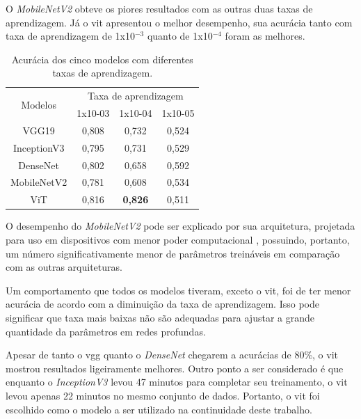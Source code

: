 O \textit{MobileNetV2} obteve os piores resultados com as outras duas taxas de aprendizagem.
Já o \acrshort{vit} apresentou o melhor desempenho, sua acurácia tanto com taxa de aprendizagem de 1x10$^{-3}$ quanto de 1x10$^{-4}$ foram as melhores.

\begin{table}[tb]
\caption{\label{tab:metrics} Acurácia dos cinco modelos com diferentes taxas de aprendizagem.}
\begin{center}
\begin{tabular}{c|ccc}
\toprule
\multirow{2}{*}{Modelos} & \multicolumn{3}{c}{Taxa de aprendizagem}   \\
                         & 1x10-03     & 1x10-04     & 1x10-05     \\
\midrule
VGG19                    & 0,808 & 0,732 & 0,524 \\
\midrule
InceptionV3              & 0,795     & 0,731     & 0,529        \\
\midrule
DenseNet                 & 0,802     & 0,658     & 0,592     \\
\midrule
MobileNetV2              & 0,781  & 0,608 & 0,534 \\
\midrule
ViT                      & 0,816     & \textbf{0,826}     & 0,511     \\
\bottomrule
\end{tabular}
\end{center}
%
\end{table}

O desempenho do \textit{MobileNetV2} pode ser explicado por sua arquitetura, projetada para uso em dispositivos com menor poder computacional \cite{mobilenetv2}, possuindo, portanto, um número significativamente menor de parâmetros treináveis em comparação com as outras arquiteturas.

Um comportamento que todos os modelos tiveram, exceto o \acrshort{vit}, foi de ter menor acurácia de acordo com a diminuição da taxa de aprendizagem. 
Isso pode significar que taxa mais baixas não são adequadas para ajustar a grande quantidade da parâmetros em redes profundas.

Apesar de tanto o \acrshort{vgg} quanto o \textit{DenseNet} chegarem a acurácias de 80\%, o \acrshort{vit} mostrou resultados ligeiramente melhores. 
Outro ponto a ser considerado é que enquanto o \textit{InceptionV3} levou 47 minutos para completar seu treinamento, o \acrshort{vit} levou apenas 22 minutos no mesmo conjunto de dados. 
Portanto, o \acrshort{vit} foi escolhido como o modelo a ser utilizado na continuidade deste trabalho.
